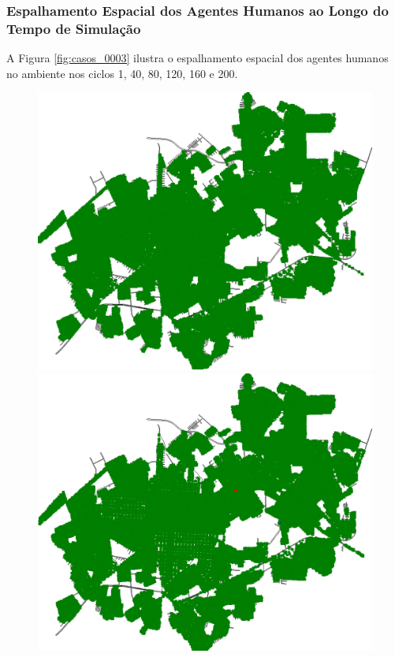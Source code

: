 \newpage

\subsubsection{Espalhamento Espacial dos Agentes Humanos ao Longo do Tempo de Simulação}

A Figura \ref{fig:casos_0003} ilustra o espalhamento espacial dos agentes humanos no ambiente nos ciclos 1, 40, 80, 120, 160 e 200.

\begin{figure}[H]
  \centering
  \begin{minipage}{.5\textwidth}
    \centering
    \includegraphics[width=1.0\textwidth]{Figuras/Resultados/0003/Saidas/MonteCarlo_0/Simulacao_0/Espacial/00000.png}
    \captionsetup{labelformat=empty}
  \end{minipage}%
  \begin{minipage}{.5\textwidth}
    \centering
    \includegraphics[width=1.0\textwidth]{Figuras/Resultados/0003/Saidas/MonteCarlo_0/Simulacao_0/Espacial/00040.png}

\end{minipage}
\end{figure}
